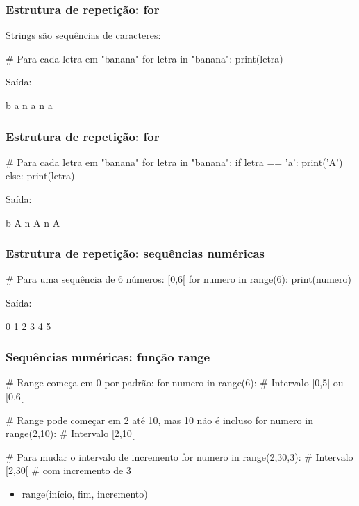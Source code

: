 \documentclass{beamer}
\begin{document}
\begin{frame}[fragile]
    \frametitle{Estrutura de repetição: for}

Strings são sequências de caracteres:
\begin{python}
# Para cada letra em "banana"
for letra in "banana":
  print(letra)
\end{python}

Saída: 

\begin{python}
b
a
n
a
n
a
\end{python}
\end{frame}   

\begin{frame}[fragile]
    \frametitle{Estrutura de repetição: for}

\begin{python}
# Para cada letra em "banana"
for letra in "banana":
    if letra == 'a':
        print('A')
    else:
        print(letra) 
\end{python}

Saída: 

\begin{python}
b
A
n
A
n
A
\end{python}
\end{frame}   


\begin{frame}[fragile]
    \frametitle{Estrutura de repetição: sequências numéricas}

\begin{python}
# Para uma sequência de 6 números: [0,6[
for numero in range(6):
    print(numero)
\end{python}

Saída: 

\begin{python}
0
1
2
3
4
5
\end{python}
\end{frame} 


\begin{frame}[fragile]
    \frametitle{Sequências numéricas: função range}

\begin{python}
# Range começa em 0 por padrão:
for numero in range(6):     # Intervalo [0,5] ou [0,6[


# Range pode começar em 2 até 10, mas 10 não é incluso
for numero in range(2,10):     # Intervalo [2,10[


# Para mudar o intervalo de incremento
for numero in range(2,30,3):     # Intervalo [2,30[ 
                                 # com incremento de 3

\end{python}

\begin{itemize}
    \item range(início, fim, incremento)
\end{itemize}

\end{frame} 
\end{document}
